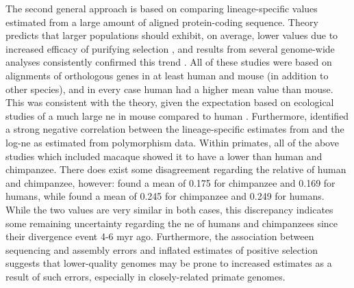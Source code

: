 The second general approach is based on comparing lineage-specific
\dnds values estimated from a large amount of aligned protein-coding
sequence. Theory predicts that larger populations should exhibit, on
average, lower \dnds values due to increased efficacy of purifying
selection \citep{Ellegren2008}, and results from several genome-wide
analyses consistently confirmed this trend
\citep{LindbladToh2005Genome,Macaque2007,Sequencing2005a,Warren2008b,Kosiol2008}. All
of these studies were based on alignments of orthologous genes in at
least human and mouse (in addition to other species), and in every
case human had a higher mean \dnds value than mouse. This was
consistent with the theory, given the expectation based on ecological
studies of a much large \ac{ne} in mouse compared to human
\citep{Ellegren2008}. Furthermore, \citet{Ellegren2008} identified a
strong negative correlation between the lineage-specific \dnds
estimates from \citet{Kosiol2008} and the log-\ac{ne} as estimated
from polymorphism data. Within primates, all of the above studies
which included macaque showed it to have a lower \dnds than human and
chimpanzee. There does exist some disagreement regarding the relative
\dnds of human and chimpanzee, however: \citet{Macaque2007} found a
mean \dnds of 0.175 for chimpanzee and 0.169 for humans, while
\citet{Kosiol2008} found a mean \dnds of 0.245 for chimpanzee and
0.249 for humans. While the two values are very similar in both cases,
this discrepancy indicates some remaining uncertainty regarding the
\ac{ne} of humans and chimpanzees since their divergence event 4-6
\ac{myr} ago. Furthermore, the association between sequencing and
assembly errors and inflated estimates of positive selection
\citep{Schneider2009} suggests that lower-quality genomes may be prone
to increased \dnds estimates as a result of such errors, especially in
closely-related primate genomes.

